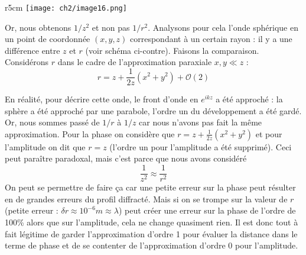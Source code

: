 \begin{wrapfigure}[9]{r}{5cm}
\vspace{-5mm}
\texttt{[image: ch2/image16.png]}
\end{wrapfigure}
Or, nous obtenons $1/z^2$ et non pas $1/r^2$. Analysons pour cela l'onde sphérique en un 
point de coordonnée $(x,y,z)$ correspondant à un certain rayon : il y a une différence 
entre $z$ et $r$ (voir schéma ci-contre). Faisons la comparaison. Considérons $r$ dans le 
cadre de l'approximation paraxiale $x,y \ll z$ :
\begin{equation}
r = z+\frac{1}{2z}(x^2+y^2) + \mathcal{O}(2)
\end{equation}



En réalité, pour décrire cette onde, le front d'onde en $e^{ikz}$ a été approché : la 
sphère a été approché par une parabole, l'ordre un du développement a été gardé. Or, nous 
sommes passé de $1/r$ à $1/z$ car nous n'avons pas fait la même 
approximation. Pour la phase on considère que $r = z +\frac{1}{2z}(x^2+y^2)$ et pour l'amplitude 
on dit que $r=z$ (l'ordre un pour l'amplitude a été supprimé). Ceci peut paraître paradoxal, 
mais c'est parce que nous avons considéré 
\begin{equation}
\frac{1}{z^2}\approx\frac{1}{r^2}
\end{equation}
On peut se permettre de faire ça car une petite erreur sur la phase peut résulter en de 
grandes erreurs du profil diffracté. Mais si on se trompe sur la valeur de $r$ (petite 
erreur : $\delta r \approx 10^{-6}m\approx \lambda$) peut créer une erreur sur la phase 
de l'ordre de 100\% alors que sur l'amplitude, cela ne change quasiment rien. Il est donc 
tout à fait légitime de garder l'approximation d'ordre 1 pour évaluer la distance dans le 
terme de phase et de se contenter de l'approximation d'ordre 0 pour l'amplitude.

















































